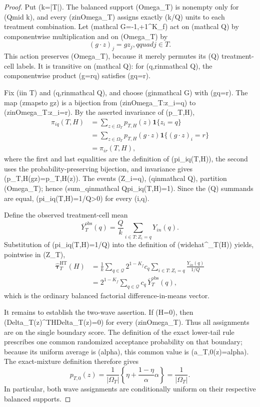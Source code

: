 \documentclass{article}
\begin{document}
\begin{proof}
Put (k=|T|).  The balanced support (Omega\_T) is nonempty only for (Qmid k), and every (zinOmega\_T) assigns exactly (k/Q) units to each treatment combination.  Let (mathcal G={-1,+1}\textasciicircum{}{K\_f}) act on (mathcal Q) by componentwise multiplication and on (Omega\_T) by
\[
(g\cdot z)_j=g z_j,qquad j\in T.
\]
This action preserves (Omega\_T), because it merely permutes its (Q) treatment-cell labels.  It is transitive on (mathcal Q): for (q,rinmathcal Q), the componentwise product (g=rq) satisfies (gq=r).

Fix (iin T) and (q,rinmathcal Q), and choose (ginmathcal G) with (gq=r).  The map (zmapsto g\cdot z) is a bijection from ({zinOmega\_T:z\_i=q}) to ({zinOmega\_T:z\_i=r}).  By the asserted invariance of (p\_{T,H}),
\[
\begin{aligned}
\pi_{iq}(T,H)
&=\sum_{z\in\Omega_T}p_{T,H}(z)\mathbf 1\{z_i=q\}\\
&=\sum_{z\in\Omega_T}p_{T,H}(g\cdot z)\mathbf 1\{(g\cdot z)_i=r\}\\
&=\pi_{ir}(T,H),
\end{aligned}
\]
where the first and last equalities are the definition of (pi\_{iq}(T,H)), the second uses the probability-preserving bijection, and invariance gives (p\_{T,H}(g\cdot z)=p\_{T,H}(z)).  The events ({Z\_i=q}), (qinmathcal Q), partition (Omega\_T); hence (sum\_{qinmathcal Q}pi\_{iq}(T,H)=1).  Since the (Q) summands are equal, (pi\_{iq}(T,H)=1/Q>0) for every (i,q).

Define the observed treatment-cell mean
\[
\overline Y_T^{\mathrm{obs}}(q)=\frac{Q}{k}\sum_{i\in T:Z_i=q}Y_{in}(q).
\]
Substitution of (pi\_{iq}(T,H)=1/Q) into the definition of (widehat{\boldsymbol\tau}\textasciicircum{}{}\_T(H)) yields, pointwise in (Z\_T),
\[
\begin{aligned}
\widehat{\boldsymbol\tau}^{\mathrm{HT}}_T(H)
&=\frac1k\sum_{q\in\mathcal Q}2^{1-K_f}c_q
       \sum_{i\in T:Z_i=q}\frac{Y_{in}(q)}{1/Q}\\
&=2^{1-K_f}\sum_{q\in\mathcal Q}c_q\,
       \overline Y_T^{\mathrm{obs}}(q),
\end{aligned}
\]
which is the ordinary balanced factorial difference-in-means vector.

It remains to establish the two-wave assertion.  If (H=0), then (Delta\_T(z)\textasciicircum{}{\mathsf T}HDelta\_T(z)=0) for every (zinOmega\_T).  Thus all assignments are on the single boundary score.  The definition of the exact lower-tail rule prescribes one common randomized acceptance probability on that boundary; because its uniform average is (alpha), this common value is (a\_{T,0}(z)=alpha).  The exact-mixture definition therefore gives
\[
p_{T,0}(z)=\frac1{|\Omega_T|}
\left\{\eta+\frac{1-\eta}{\alpha}\alpha\right\}
=\frac1{|\Omega_T|}.
\]
In particular, both wave assignments are conditionally uniform on their respective balanced supports.


\end{proof}
\end{document}
